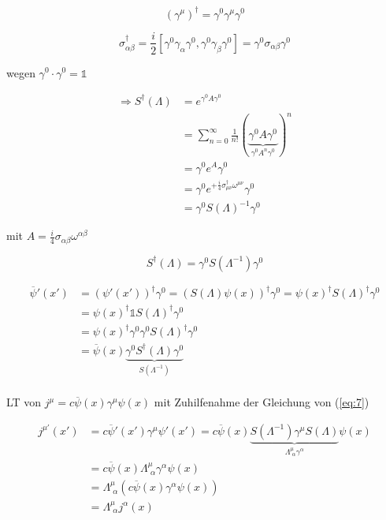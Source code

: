 \[(\gamma^\mu)^\dagger = \gamma^0\gamma^\mu\gamma^0\]

\[\sigma^\dagger_{\alpha\beta} = \frac{i}{2}[ \gamma^0\gamma_\alpha\gamma^0, \gamma^0\gamma_\beta\gamma^0] = \gamma^0\sigma_{\alpha\beta}\gamma^0\]

wegen \(\gamma^0\cdot \gamma^0=\mathbb 1\)


\begin{align}
\Rightarrow  S^\dagger(\Lambda) &= e^{\gamma^0 A\gamma^0}\\
&=\sum_{n=0}^\infty \frac{1}{n!}(\underbrace{\gamma^0 A \gamma^0}_{\gamma^0 A^n \gamma^0})^n \\
&= \gamma^0 e^A \gamma^0 \\
&= \gamma^0 e^{+\frac{i}{4}\sigma^\dagger_{\mu\nu}\omega^{\mu\nu}}  \gamma^0 \\
&= \gamma^0 S(\Lambda)^{-1}\gamma^0
\end{align}

mit \(A = \frac{i}{4}\sigma_{\alpha\beta}\omega^{\alpha\beta}\)

\[\boxed{S^\dagger (\Lambda) = \gamma^0S(\Lambda^{-1})\gamma^0 }\]

\begin{align}
\overline\psi'(x') &= (\psi'(x'))^\dagger\gamma^0 = (S(\Lambda)\psi(x))^\dagger\gamma^0 = \psi(x)^\dagger S(\Lambda)^\dagger\gamma^0 \\
&=\psi(x)^\dagger \mathbb 1 S(\Lambda)^\dagger\gamma^0 \\
&=\psi(x)^\dagger \gamma^0\gamma^0 S(\Lambda)^\dagger\gamma^0 \\
&= \overline\psi(x)\underbrace{\gamma^0S^\dagger(\Lambda)\gamma^0}_{S(\Lambda^{-1})}  \\
\end{align}

LT von \(j^\mu = c\overline\psi(x)\gamma^\mu\psi(x)\) mit Zuhilfenahme der Gleichung von (\ref{eq:7})

\begin{align}
j^{\mu'}(x') &= c\overline\psi'(x')\gamma^\mu\psi'(x') = c\overline\psi(x)\underbrace{S(\Lambda^{-1})\gamma^\mu S(\Lambda)}_{\Lambda^\mu_{\,\,\alpha}\gamma^\alpha}\psi(x)\\
&=c\overline\psi(x)\Lambda^\mu_{\,\,\alpha}\gamma^\alpha\psi(x)\\
&=\Lambda^\mu_{\,\,\alpha}(c\overline\psi(x)\gamma^\alpha\psi(x))\\
&= \Lambda^\mu_{\,\,\alpha}j^\alpha(x)
\end{align}

